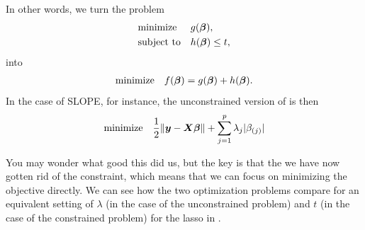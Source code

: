 In other words, we turn the problem
\[
  \begin{aligned}
     & \text{minimize}   &  & g(\boldsymbol{\beta}),       \\
     & \text{subject to} &  & h(\boldsymbol{\beta})\leq t,
  \end{aligned}
\]
into
\[
  \begin{aligned}
    \text{minimize} &  & f(\boldsymbol{\beta}) = g(\boldsymbol{\beta}) + h(\boldsymbol{\beta}).
  \end{aligned}
\]
In the case of SLOPE, for instance, the unconstrained version of  is then
\[
  \begin{aligned}
    \text{minimize} &  & \frac{1}{2} \lVert \boldsymbol{y} - \boldsymbol{X}\boldsymbol{\beta}\rVert + \sum_{j=1}^p \lambda_j |\beta_{(j)}|
  \end{aligned}
\]

You may wonder what good this did us, but the key is that the we have now gotten rid of the constraint, which means that we can focus on minimizing the objective directly. We can see how the two optimization problems compare for an equivalent setting of \(\lambda\) (in the case of the unconstrained problem) and \(t\) (in the case of the constrained problem) for the lasso in .

